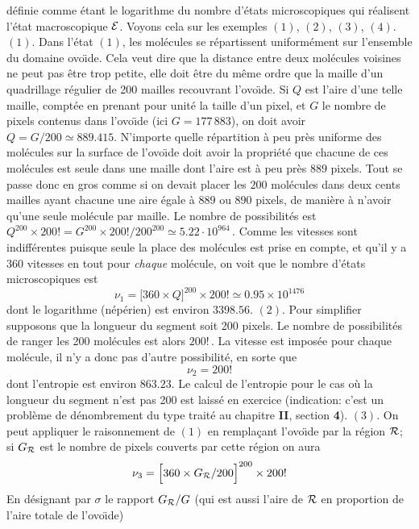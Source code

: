 d\'efinie comme \'etant le logarithme du nombre d'\'etats microscopiques 
qui r\'ealisent l'\'etat macroscopique ${\cal E}$. Voyons cela sur les 
exemples $(1)$,  $(2)$,  $(3)$,  $(4)$. 
\medskip
$(1)$. Dans l'\'etat $(1)$, les mol\'ecules se r\'epartissent uniform\'ement 
sur l'ensemble du domaine ovo{\"\i}de. Cela veut dire que la distance entre 
deux mol\'ecules voisines ne peut pas \^etre trop petite, elle doit \^etre 
du m\^eme ordre que la maille d'un quadrillage r\'egulier de 200 mailles 
recouvrant l'ovo{\"\i}de. Si $Q$ est l'aire d'une telle maille, 
compt\'ee en prenant pour unit\'e la taille d'un pixel, et $G$ le nombre
de pixels contenus dans l'ovo{\"\i}de (ici $G = 177\, 883$), on doit avoir
$Q = G / 200 \simeq 889.415$.
N'importe quelle r\'epartition \`a peu pr\`es uniforme des mol\'ecules sur 
la surface de l'ovo{\"\i}de doit avoir la propri\'et\'e que chacune de 
ces mol\'ecules est seule dans une maille dont l'aire est \`a peu pr\`es 
$889$ pixels. Tout se passe donc en gros comme si on devait placer les 
$200$ mol\'ecules dans deux cents mailles 
ayant chacune une aire \'egale \`a $889$ ou $890$ pixels, de 
mani\`ere \`a n'avoir qu'une seule mol\'ecule par maille. Le nombre de 
possibilit\'es est $Q^{200} \times 200! = G^{200} \times 200! / 
200^{200} \simeq 5.22 \cdot 10^{964}\,$.  Comme
les vitesses sont indiff\'erentes puisque seule la place des mol\'ecules
est prise en compte, et qu'il y a $360$ vitesses en tout pour {\it chaque}
mol\'ecule, on voit que le nombre d'\'etats microscopiques est
$$\nu_1 = \Big[360 \times Q \Big]^{200} \times 200! \simeq 
0.95 \times 10^{1476}$$
dont le logarithme (n\'ep\'erien) est environ $3398.56$.
\medskip
$(2)$. Pour simplifier supposons que la longueur du segment soit 200 
pixels. Le nombre de possibilit\'es de ranger les 200
mol\'ecules est alors $200!\,$. La vitesse est impos\'ee pour chaque 
mol\'ecule, il n'y a donc pas d'autre possibilit\'e, en sorte que 
$$\nu_2 = 200!$$
dont l'entropie est  environ $863.23$. Le calcul de l'entropie pour le 
cas o\`u la longueur du segment n'est pas 200 est laiss\'e en exercice
(indication: c'est un probl\`eme de d\'enombrement du type trait\'e 
au chapitre {\bf II}, section {\bf 4}). 
\medskip
$(3)$. On peut appliquer le raisonnement de $(1)$ en rempla\c{c}ant 
l'ovo{\"\i}de par la r\'egion ${\cal R}$; si $G_{\cal R}$ est le   
nombre de pixels couverts par cette r\'egion on aura
$$\nu_3 = \Big[360 \times G_{\cal R} / 200 \Big]^{200} \times 200!$$
En d\'esignant par $\sigma$ le rapport $G_{\cal R} / G$ (qui est aussi 
l'aire de ${\cal R}$ en proportion de l'aire totale de l'ovo{\"\i}de)
